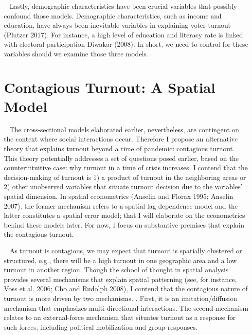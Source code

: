 \documentclass[
  12pt,
]{article}
\begin{document}
~ Lastly, demographic characteristics have been crucial variables that
possibly confound those models. Demographic characteristics, such as
income and education, have always been inevitable variables in
explaining voter turnout (Plutzer 2017). For instance, a high level of
education and literacy rate is linked with electoral participation
Diwakar (2008). In short, we need to control for these variables should
we examine those three models.

\hypertarget{contagious-turnout-a-spatial-model}{%
\section{Contagious Turnout: A Spatial
Model}\label{contagious-turnout-a-spatial-model}}

~ The cross-sectional models elaborated earlier, nevertheless, are
contingent on the context where social interactions occur. Therefore I
propose an alternative theory that explains turnout beyond a time of
pandemic: contagious turnout. This theory potentially addresses a set of
questions posed earlier, based on the counterintuitive case: why turnout
in a time of crisis increases. I contend that the decision-making of
turnout is 1) a product of turnout in the neighboring areas or 2) other
unobserved variables that situate turnout decision due to the variables'
spatial dimension. In spatial econometrics (Anselin and Florax 1995;
Anselin 2007), the former mechanism refers to a spatial lag dependence
model and the latter constitutes a spatial error model; that I will
elaborate on the econometrics behind these models later. For now, I
focus on substantive premises that explain the contagious turnout.

~ As turnout is contagious, we may expect that turnout is spatially
clustered or structured, e.g., there will be a high turnout in one
geographic area and a low turnout in another region. Though the school
of thought in spatial analysis provides several mechanisms that explain
spatial patterning (see, for instance, Voss et al. 2006; Cho and Rudolph
2008), I contend that the contagious nature of turnout is more driven by
two mechanisms. . First, it is an imitation/diffusion mechanism that
emphasizes multi-directional interactions. The second mechanism relates
to an external-force mechanism that situates turnout as a response for
such forces, including political mobilization and group responses.
\end{document}

